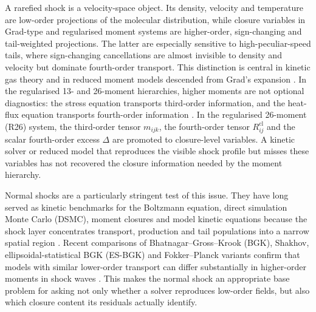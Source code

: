 \documentclass[lineno,paper]{JFM-FLM_Au}
\newenvironment{revision}{\nolinenumbers\begin{tcolorbox}[breakable,colback=revisionyellow,colframe=revisionyellow,boxrule=0pt,arc=0pt,left=5pt,right=5pt,top=5pt,bottom=5pt,before skip=6pt,after skip=6pt]\captionsetup{width=\linewidth}}{\end{tcolorbox}\linenumbers}
\newenvironment{revision}{}{}
\newcommand{\cl}{\mathrm{cl}}
\begin{document}
\begin{revision}
A rarefied shock is a velocity-space object.  Its density, velocity and temperature are low-order projections of the molecular distribution, while closure variables in Grad-type and regularised moment systems are higher-order, sign-changing and tail-weighted projections.  The latter are especially sensitive to high-peculiar-speed tails, where sign-changing cancellations are almost invisible to density and velocity but dominate fourth-order transport.  This distinction is central in kinetic gas theory \citep{Cercignani1988,Sone2007,Bird1994} and in reduced moment models descended from Grad's expansion \citep{Grad1949,Levermore1996,Struchtrup2005,Torrilhon2016}.  In the regularised 13- and 26-moment hierarchies, higher moments are not optional diagnostics: the stress equation transports third-order information, and the heat-flux equation transports fourth-order information \citep{StruchtrupTorrilhon2003,TorrilhonStruchtrup2004,StruchtrupTorrilhon2007PRL,GuEmerson2009R26}.  In the regularised 26-moment (R26) system, the third-order tensor $m_{ijk}$, the fourth-order tensor $R^{\cl}_{ij}$ and the scalar fourth-order excess $\Delta$ are promoted to closure-level variables.  A kinetic solver or reduced model that reproduces the visible shock profile but misses these variables has not recovered the closure information needed by the moment hierarchy.
\end{revision}

\begin{revision}
Normal shocks are a particularly stringent test of this issue.  They have long served as kinetic benchmarks for the Boltzmann equation, direct simulation Monte Carlo (DSMC), moment closures and model kinetic equations because the shock layer concentrates transport, production and tail populations into a narrow spatial region \citep{MottSmith1951Shock,Alsmeyer1976Shock,IvanovGimelshein1998Hypersonic}.  Recent comparisons of Bhatnagar--Gross--Krook (BGK), Shakhov, ellipsoidal-statistical BGK (ES-BGK) and Fokker--Planck variants confirm that models with similar lower-order transport can differ substantially in higher-order moments in shock waves \citep{FeiLiuLiuZhang2020ShockBenchmark}.  This makes the normal shock an appropriate base problem for asking not only whether a solver reproduces low-order fields, but also which closure content its residuals actually identify.
\end{revision}
\end{document}
